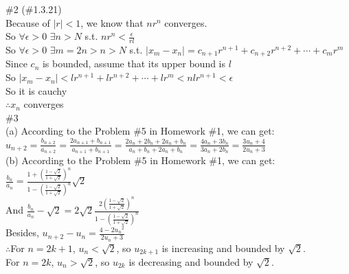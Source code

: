 \documentclass{article}
\begin{document}
\textcolor[rgb]{0.00,0.00,0.50}{\#2 (\#1.3.21)}\\

Because of $|r|<1$, we know that $nr^n$ converges.\\

So $\forall\epsilon>0$ $\exists n>N$ s.t. $\displaystyle nr^n<\frac{\epsilon}{rl}$\\

So $\forall\epsilon>0$ $\exists m=2n>n>N$ s.t. $|x_m-x_n|=c_{n+1}r^{n+1}+c_{n+2}r^{n+2}+\cdots+c_mr^m$\\

Since $c_n$ is bounded, assume that its upper bound is $l$\\

So $|x_m-x_n|<lr^{n+1}+lr^{n+2}+\cdots+lr^m<nlr^{n+1}<\epsilon$\\

So it is cauchy\\

$\therefore$\qquad $x_n$ converges\\

\textcolor[rgb]{0.00,0.00,0.50}{\#3}\\

(a) According to the Problem \#5 in Homework \#1, we can get:\\

$\displaystyle u_{n+2}=\frac{b_{n+2}}{a_{n+2}}=\frac{2a_{n+1}+b_{n+1}}{a_{n+1}+b_{n+1}}=\frac{2a_n+2b_n+2a_n+b_n}{a_n+b_n+2a_n+b_n}=\frac{4a_n+3b_n}{3a_n+2b_n}=\frac{3u_n+4}{2u_n+3}$\\


(b) According to the Problem \#5 in Homework \#1, we can get: \\

$\displaystyle \frac{b_n}{a_n}=\frac{1+\left(\frac{1-\sqrt{2}}{1+\sqrt{2}}\right)^n}{1-\left(\frac{1-\sqrt{2}}{1+\sqrt{2}}\right)^n}\sqrt{2}$\\

And $\displaystyle \frac{b_n}{a_n}-\sqrt{2}=2\sqrt{2}\frac{2\left(\frac{1-\sqrt{2}}{1+\sqrt{2}}\right)^n}{1-\left(\frac{1-\sqrt{2}}{1+\sqrt{2}}\right)^n}$\\

Besides, $\displaystyle u_{n+2}-u_n=\frac{4-2{u_n}^2}{2u_n+3}$\\

$\therefore$\qquad For $n=2k+1$, $u_n<\sqrt{2}$, so $u_{2k+1}$ is increasing and bounded by $\sqrt{2}$.\\

\qquad\quad        For $n=2k$, $u_n>\sqrt{2}$, so $u_{2k}$ is decreasing and bounded by $\sqrt{2}$.\\
\end{document}
